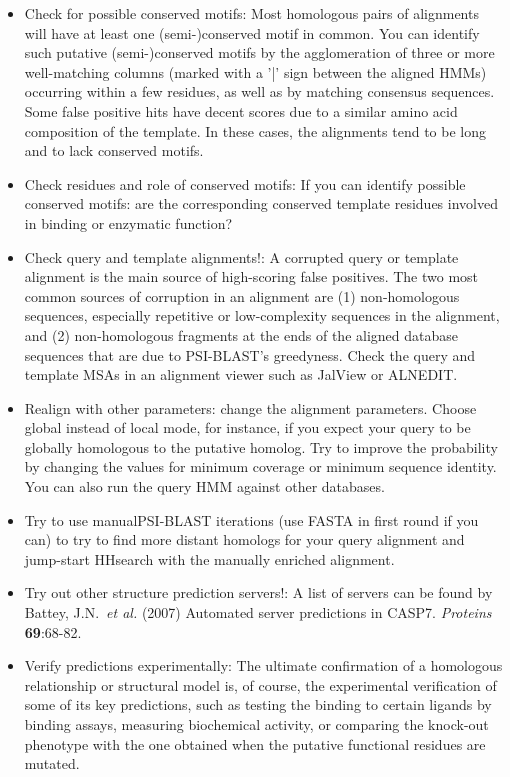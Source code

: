 \documentclass[11pt,a4paper]{article}
\begin{document}
\begin{itemize}
\item{Check for possible conserved motifs: Most homologous pairs of alignments will have at least one (semi-)conserved motif in common. You can identify such putative (semi-)conserved motifs by the agglomeration of three or more well-matching columns (marked with a '|' sign between the aligned HMMs) occurring within a few residues, as well as by matching consensus sequences. Some false positive hits have decent scores due to a similar amino acid composition of the template. In these cases, the alignments tend to be long and to lack conserved motifs.}

\item{Check residues and role of conserved motifs: If you can identify possible conserved motifs: are the corresponding conserved template residues involved in binding or enzymatic function?}

\item{Check query and template alignments!: A corrupted query or template alignment is the main source of high-scoring false positives. The two most common sources of corruption in an alignment are (1) non-homologous sequences, especially repetitive or low-complexity sequences in the alignment, and (2) non-homologous fragments at the ends of the aligned database sequences that are due to PSI-BLAST's greedyness. Check the query and template MSAs in an alignment viewer such as JalView or ALNEDIT.}

\item{Realign with other parameters: change the alignment parameters. Choose global instead of local mode, for instance, if you expect your query to be globally homologous to the putative homolog. Try to improve the probability by changing the values for minimum coverage or minimum sequence identity. You can also run the query HMM against other databases.}

\item{Try to use manualPSI-BLAST iterations (use FASTA in first round if you can) to try to find more distant homologs for your query alignment and jump-start HHsearch with the manually enriched alignment.}

\item{Try out other structure prediction servers!: A list of servers can be found by Battey, J.N.\ \emph{et al.} (2007) Automated server predictions in CASP7. \emph{Proteins} {\bf 69}:68-82.}

\item{Verify predictions experimentally: The ultimate confirmation of a homologous relationship or structural model is, of course, the experimental verification of some of its key predictions, such as testing the binding to certain ligands by binding assays, measuring biochemical activity, or comparing the knock-out phenotype with the one obtained when the putative functional residues are mutated.}
\end{itemize}
\end{document}
